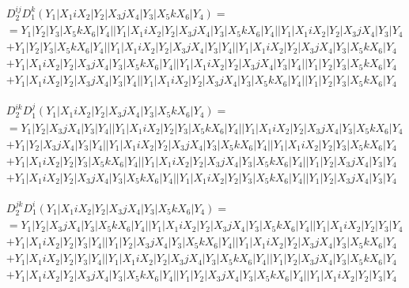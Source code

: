 \documentclass{article}[12pt]
\begin{document}
\begin{align*}
&D_2^{ij}D_1^k(Y_1|X_1iX_2|Y_2|X_3jX_4|Y_3|X_5kX_6|Y_4) =\\
&=Y_1|Y_2|Y_3|X_5kX_6|Y_4||Y_1|X_1iX_2|Y_2|X_3jX_4|Y_3|X_5kX_6|Y_4||Y_1|X_1iX_2|Y_2|X_3jX_4|Y_3|Y_4\\ 
 & +Y_1|Y_2|Y_3|X_5kX_6|Y_4||Y_1|X_1iX_2|Y_2|X_3jX_4|Y_3|Y_4||Y_1|X_1iX_2|Y_2|X_3jX_4|Y_3|X_5kX_6|Y_4\\ 
 & +Y_1|X_1iX_2|Y_2|X_3jX_4|Y_3|X_5kX_6|Y_4||Y_1|X_1iX_2|Y_2|X_3jX_4|Y_3|Y_4||Y_1|Y_2|Y_3|X_5kX_6|Y_4\\ 
 & +Y_1|X_1iX_2|Y_2|X_3jX_4|Y_3|Y_4||Y_1|X_1iX_2|Y_2|X_3jX_4|Y_3|X_5kX_6|Y_4||Y_1|Y_2|Y_3|X_5kX_6|Y_4\end{align*}

\begin{align*}
& D_2^{ik}D_1^j(Y_1|X_1iX_2|Y_2|X_3jX_4|Y_3|X_5kX_6|Y_4) =\\
&=Y_1|Y_2|X_3jX_4|Y_3|Y_4||Y_1|X_1iX_2|Y_2|Y_3|X_5kX_6|Y_4||Y_1|X_1iX_2|Y_2|X_3jX_4|Y_3|X_5kX_6|Y_4\\ 
 & +Y_1|Y_2|X_3jX_4|Y_3|Y_4||Y_1|X_1iX_2|Y_2|X_3jX_4|Y_3|X_5kX_6|Y_4||Y_1|X_1iX_2|Y_2|Y_3|X_5kX_6|Y_4\\ 
 & +Y_1|X_1iX_2|Y_2|Y_3|X_5kX_6|Y_4||Y_1|X_1iX_2|Y_2|X_3jX_4|Y_3|X_5kX_6|Y_4||Y_1|Y_2|X_3jX_4|Y_3|Y_4\\ 
 & +Y_1|X_1iX_2|Y_2|X_3jX_4|Y_3|X_5kX_6|Y_4||Y_1|X_1iX_2|Y_2|Y_3|X_5kX_6|Y_4||Y_1|Y_2|X_3jX_4|Y_3|Y_4\end{align*}

\begin{align*}
& D_2^{jk}D_1^i(Y_1|X_1iX_2|Y_2|X_3jX_4|Y_3|X_5kX_6|Y_4) =\\
&=Y_1|Y_2|X_3jX_4|Y_3|X_5kX_6|Y_4||Y_1|X_1iX_2|Y_2|X_3jX_4|Y_3|X_5kX_6|Y_4||Y_1|X_1iX_2|Y_2|Y_3|Y_4\\ 
 & +Y_1|X_1iX_2|Y_2|Y_3|Y_4||Y_1|Y_2|X_3jX_4|Y_3|X_5kX_6|Y_4||Y_1|X_1iX_2|Y_2|X_3jX_4|Y_3|X_5kX_6|Y_4\\ 
 & +Y_1|X_1iX_2|Y_2|Y_3|Y_4||Y_1|X_1iX_2|Y_2|X_3jX_4|Y_3|X_5kX_6|Y_4||Y_1|Y_2|X_3jX_4|Y_3|X_5kX_6|Y_4\\ 
 & +Y_1|X_1iX_2|Y_2|X_3jX_4|Y_3|X_5kX_6|Y_4||Y_1|Y_2|X_3jX_4|Y_3|X_5kX_6|Y_4||Y_1|X_1iX_2|Y_2|Y_3|Y_4\end{align*}
\end{document}

